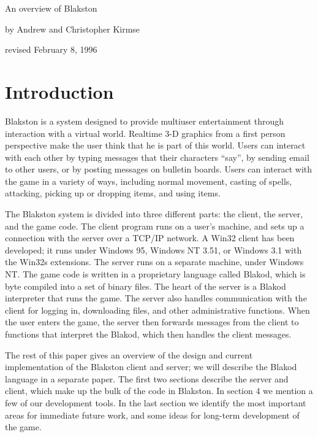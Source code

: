 \documentclass[12pt]{article}
\begin{document}
\begin{center}
{\LARGE An overview of Blakston}
\vspace{0.2in}

{\Large by Andrew and Christopher Kirmse}

\vspace{0.2in}

{\Large revised February 8, 1996}
\end{center}


\section{Introduction}

Blakston is a system designed to provide multiuser entertainment
through interaction with a virtual world.  Realtime 3-D graphics from
a first person perspective make the user think that he is part of this
world.  Users can interact with each other by typing messages that
their characters ``say'', by sending email to other users, or by
posting messages on bulletin boards.  Users can interact with the game
in a variety of ways, including normal movement, casting of spells,
attacking, picking up or dropping items, and using items.

The Blakston system is divided into three different parts: the client,
the server, and the game code.  The client program runs on a user's
machine, and sets up a connection with the server over a TCP/IP
network.  A Win32 client has been developed; it runs under Windows 95,
Windows NT 3.51, or Windows 3.1 with the Win32s extensions.  The
server runs on a separate machine, under Windows NT.  The game code is
written in a proprietary language called Blakod, which is byte
compiled into a set of binary files.  The heart of the server is a
Blakod interpreter that runs the game. The server also handles
communication with the client for logging in, downloading files, and
other administrative functions.  When the user enters the game, the
server then forwards messages from the client to functions that
interpret the Blakod, which then handles the client messages.

The rest of this paper gives an overview of the design and current
implementation of the Blakston client and server; we will describe the
Blakod language in a separate paper.  The first two sections describe
the server and client, which make up the bulk of the code in
Blakston. In section 4 we mention a few of our development tools.  In
the last section we identify the most important areas for immediate
future work, and some ideas for long-term development of the game.
\end{document}
